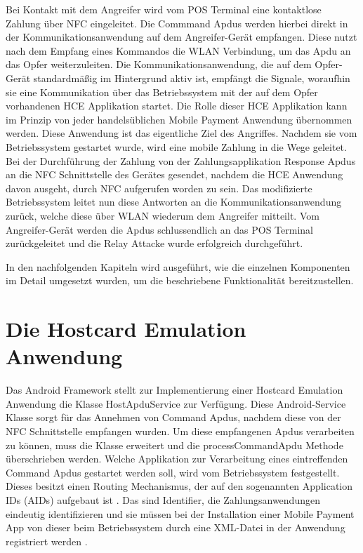  Bei Kontakt mit dem Angreifer wird vom POS Terminal eine kontaktlose Zahlung über NFC eingeleitet. Die Commmand Apdus werden hierbei direkt in der Kommunikationsanwendung auf dem Angreifer-Gerät empfangen. Diese nutzt nach dem Empfang eines Kommandos die WLAN Verbindung, um das Apdu an das Opfer weiterzuleiten. Die Kommunikationsanwendung, die auf dem Opfer-Gerät standardmäßig im Hintergrund aktiv ist, empfängt die Signale, woraufhin sie eine Kommunikation über das Betriebssystem mit der auf dem Opfer vorhandenen HCE Applikation startet. Die Rolle dieser HCE Applikation kann im Prinzip von jeder handelsüblichen Mobile Payment Anwendung übernommen werden. Diese Anwendung ist das eigentliche Ziel des Angriffes. Nachdem sie vom Betriebssystem gestartet wurde, wird eine mobile Zahlung in die Wege geleitet. 
Bei der Durchführung der Zahlung von der Zahlungsapplikation Response Apdus an die NFC Schnittstelle des Gerätes gesendet, nachdem die HCE Anwendung davon ausgeht, durch NFC aufgerufen worden zu sein. 
Das modifizierte Betriebssystem leitet nun diese Antworten an die Kommunikationsanwendung zurück, welche diese über WLAN wiederum dem Angreifer mitteilt. Vom Angreifer-Gerät werden die Apdus schlussendlich an das POS Terminal zurückgeleitet und die Relay Attacke wurde erfolgreich durchgeführt. 

In den nachfolgenden Kapiteln wird ausgeführt, wie die einzelnen Komponenten im Detail umgesetzt wurden, um die beschriebene Funktionalität bereitzustellen. 

\section{Die Hostcard Emulation Anwendung}

Das Android Framework stellt zur Implementierung einer Hostcard Emulation Anwendung die Klasse HostApduService zur Verfügung. Diese Android-Service Klasse sorgt für das Annehmen von Command Apdus, nachdem diese von der NFC Schnittstelle empfangen wurden. Um diese empfangenen Apdus verarbeiten zu können, muss die Klasse erweitert und die processCommandApdu Methode überschrieben werden. 
Welche Applikation zur Verarbeitung eines eintreffenden Command Apdus gestartet werden soll, wird vom Betriebssystem festgestellt. Dieses besitzt einen Routing Mechanismus, der auf den sogenannten Application IDs (AIDs) aufgebaut ist \cite{androidHce}. Das sind Identifier, die Zahlungsanwendungen eindeutig identifizieren und sie müssen bei der Installation einer Mobile Payment App von dieser beim Betriebssystem durch eine XML-Datei in der Anwendung registriert werden \cite{androidHce}.

